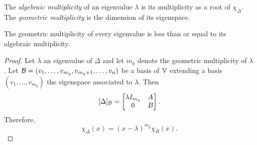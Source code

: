 \begin{defn}
    The \textsl{algebraic multiplicity} of an eigenvalue $\lambda$ is its multiplicity as a root of $\chi_\Delta$. The \textsl{geometric multiplicity} is the dimension of its eigenspace.
\end{defn}

\begin{thm}
    The geometric multiplicity of every eigenvalue is less than or equal to its algebraic multiplicity.
\end{thm}

\begin{proof}
    Let $\lambda$ an eigenvalue of $\Delta$ and let $m_g$ denote the geometric multiplicity of $\lambda$. Let $\mathcal B=(v_1,\dots,v_{m_g},v_{m_g+1},\dots,v_n)$ be a basis of $\mathbb V$ extending a basis $(v_1,\dots,v_{m_g})$ the eigenspace associated to $\lambda$. Then
    $$
        [\Delta]_{\mathcal B}= \begin{bmatrix}
                \lambda I_{m_g} &A\\
                0 &B
            \end{bmatrix}.
    $$
    Therefore,
    $$
        \chi_\Delta(x) = (x-\lambda)^{m_g}\chi_B(x).
    $$
\end{proof}

